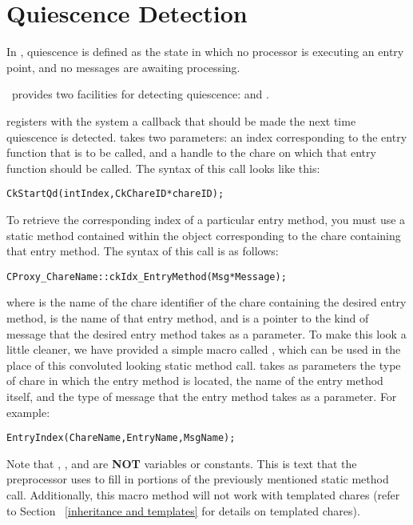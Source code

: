 \section{Quiescence Detection}

In \charmpp, quiescence is defined as the state in which no
processor is executing an entry point, and no messages are awaiting processing.

\charmpp\ provides two facilities for detecting quiescence:  and
.

 registers with the system a callback that should be made the
next time quiescence is detected.   takes two
parameters: an index corresponding to the entry function that is to be called,
and a handle to the chare on which that entry function should be called.  The
syntax of this call looks like this:

\begin{alltt}
 CkStartQd(int Index, CkChareID* chareID);
\end{alltt}

To retrieve the corresponding index of a particular entry
method, you must use a static method contained within the  object
corresponding to the chare containing that entry method.  The
syntax of this call is as follows:

\begin{alltt}
CProxy_ChareName::ckIdx_EntryMethod(Msg *Message);
\end{alltt}

where  is the name of the chare identifier of the chare containing
the desired entry method,  is the name of that entry method,
and  is a pointer to the kind of message that the desired entry
method takes as a parameter. To make this look a little cleaner, we have
provided a simple macro called , which can be used in the place
of this convoluted looking static method call.   takes as
parameters the type of chare in which the entry method is located, the name of
the entry method itself, and the type of message that the entry method takes as
a parameter. For example:

\begin{alltt}
 EntryIndex(ChareName, EntryName, MsgName);
\end{alltt}

Note that , , and  are {\bf NOT}
variables or constants. This is text that the preprocessor uses to fill in
portions of the previously mentioned static method call.  Additionally, this
macro method will not work with templated chares (refer to Section
~\ref{inheritance and templates} for details on templated chares).

